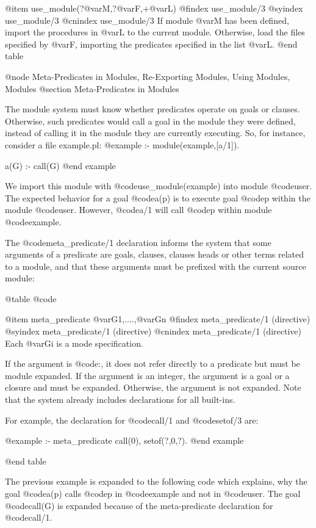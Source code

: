 {{{{@item use_module(?@var{M},?@var{F},+@var{L})
@findex use_module/3
@syindex use_module/3
@cnindex use_module/3
If module @var{M} has been defined, import the procedures in @var{L} to
the current module. Otherwise, load the files specified by @var{F},
importing the predicates specified in the list @var{L}. 
@end table


@node Meta-Predicates in Modules, Re-Exporting Modules, Using Modules, Modules
@section Meta-Predicates in Modules

The module system must know whether predicates operate on goals or
clauses. Otherwise, such predicates would call a goal in the module they
were defined, instead of calling it in the module they are currently
executing. So, for instance, consider a file example.pl:
@example
:- module(example,[a/1]).

a(G) :- call(G)
@end example

We import this module with @code{use_module(example)} into module
@code{user}.  The expected behavior for a goal @code{a(p)} is to
execute goal @code{p} within the module @code{user}. However,
@code{a/1} will call @code{p} within module @code{example}.

The @code{meta_predicate/1} declaration informs the system that some
arguments of a predicate are goals, clauses, clauses heads or other
terms related to a module, and that these arguments must be prefixed
with the current source module:

@table @code

@item meta_predicate @var{G1},....,@var{Gn}
@findex meta_predicate/1 (directive)
@syindex meta_predicate/1 (directive)
@cnindex meta_predicate/1 (directive)
Each @var{Gi} is a mode specification.

If the argument is @code{:}, it does not refer directly to a predicate
but must be module expanded. If the argument is an integer, the argument
is a goal or a closure and must be expanded. Otherwise, the argument is 
not expanded. Note that the system already includes declarations for all 
built-ins.

For example, the declaration for @code{call/1} and @code{setof/3} are:

@example
:- meta_predicate call(0), setof(?,0,?).
@end example

@end table

The previous example is expanded to the following code which explains,
why the goal @code{a(p)} calls @code{p} in @code{example} and not in
@code{user}.  The goal @code{call(G)} is expanded because of the
meta-predicate declaration for @code{call/1}.

}}}}
